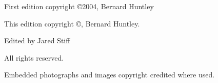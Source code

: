 
\maketitle
\thispagestyle{empty}
\clearpage

\begingroup
\footnotesize\raggedright
\mbox{}
\vfill
\thispagestyle{empty}
\begin{minipage}[b]{0.9\textwidth}
\setlength{\parskip}{0.5\baselineskip}
First edition copyright \copyright 2004, Bernard Huntley\par
This edition copyright \copyright \the\year , Bernard Huntley.\par
Edited by Jared Stiff\par
\vspace*{2\baselineskip}

All rights reserved.\par
\vspace*{2\baselineskip}

Embedded photographs and images copyright credited where used.

\end{minipage}
\vspace*{2\baselineskip}
\vfill
{}
\endgroup
\clearpage

